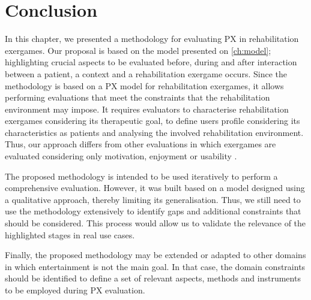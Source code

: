 \section{Conclusion}
In this chapter, we presented a methodology for evaluating PX in rehabilitation exergames. Our proposal is based on the model presented on \autoref{ch:model}; highlighting crucial aspects to be evaluated before, during and after interaction between a patient, a context and a rehabilitation exergame occurs. Since the methodology is based on a \ac{PX} model for rehabilitation exergames, it allows performing evaluations that meet the constraints that the rehabilitation environment may impose. It requires evaluators to characterise rehabilitation exergames considering its therapeutic goal, to define users profile considering its characteristics as patients and analysing the involved rehabilitation environment. Thus, our approach differs from other evaluations in which exergames are evaluated considering only motivation, enjoyment or usability \autocite{Brokaw2015,Burke2009,Cameirao2010,jansen2013serious,Ni2014}.

The proposed methodology is intended to be used iteratively to perform a comprehensive evaluation. However, it was built based on a model designed using a qualitative approach, thereby limiting its generalisation. Thus, we still need to use the methodology extensively to identify gaps and additional constraints that should be considered. This process would allow us to validate the relevance of the highlighted stages in real use cases.

Finally, the proposed methodology may be extended or adapted to other domains in which entertainment is not the main goal. In that case, the domain constraints should be identified to define a set of relevant aspects, methods and instruments to be employed during \ac{PX} evaluation.
